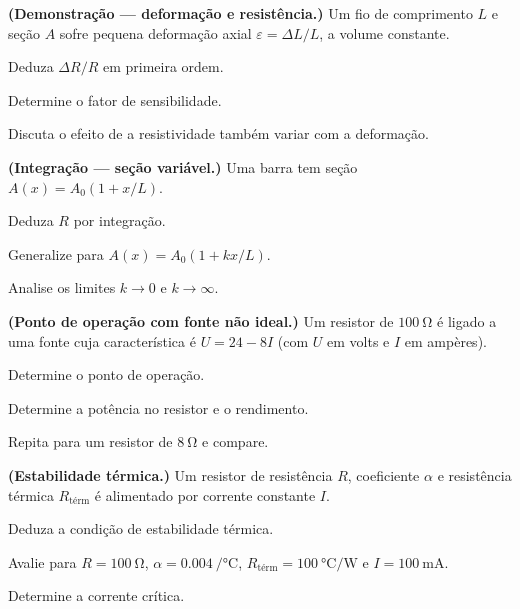 \blocodesafio
\begin{questao}[4]{}

\textbf{(Demonstração --- deformação e resistência.)} Um fio de comprimento $L$
e seção $A$ sofre pequena deformação axial $\varepsilon=\Delta L/L$, a volume
constante.
\begin{itensq}
\item Deduza $\Delta R/R$ em primeira ordem.
\item Determine o fator de sensibilidade.
\item Discuta o efeito de a resistividade também variar com a deformação.
\end{itensq}


\end{questao}
\begin{questao}[4]{}

\textbf{(Integração --- seção variável.)} Uma barra tem seção
$A(x)=A_0\left(1+x/L\right)$.
\begin{itensq}
\item Deduza $R$ por integração.
\item Generalize para $A(x)=A_0(1+kx/L)$.
\item Analise os limites $k\to0$ e $k\to\infty$.
\end{itensq}


\end{questao}
\begin{questao}[4]{}

\textbf{(Ponto de operação com fonte não ideal.)} Um resistor de
$\SI{100}{\ohm}$ é ligado a uma fonte cuja característica é
$U=24-8I$ (com $U$ em volts e $I$ em ampères).
\begin{itensq}
\item Determine o ponto de operação.
\item Determine a potência no resistor e o rendimento.
\item Repita para um resistor de $\SI{8}{\ohm}$ e compare.
\end{itensq}


\end{questao}
\begin{questao}[4]{}

\textbf{(Estabilidade térmica.)} Um resistor de resistência $R$, coeficiente
$\alpha$ e resistência térmica $R_{\text{térm}}$ é alimentado por corrente constante
$I$.
\begin{itensq}
\item Deduza a condição de estabilidade térmica.
\item Avalie para $R=\SI{100}{\ohm}$, $\alpha=\SI{0.004}{\per\celsius}$,
      $R_{\text{térm}}=\SI{100}{\celsius\per\watt}$ e $I=\SI{100}{\milli\ampere}$.
\item Determine a corrente crítica.
\end{itensq}


\end{questao}
